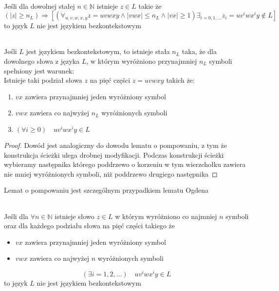 	\begin{lemat}~\\
		Jeśli dla dowolnej stałej $n\in\mathbb{N}$ istnieje $z\in L$ takie że
		\begin{equation}
			(|z| \geqslant n_L) \Rightarrow [( \forall_{u,v,w,x,y} z = uvwxy \wedge |vwx| \leqslant n_L \wedge |vx| \geqslant 1) \exists_{i=0,1,\dots} z_i = uv^iwx^iy \not\in L]
		\end{equation}
		to język $L$ nie jest językiem bezkontekstowym
	\end{lemat}			
		
	\begin{lemat}~\\
		Jeśli $L$ jest językiem bezkontekstowym, to istnieje stała $n_L$ taka, że dla dowolnego słowa z języka $L$, w którym wyróżniono przynajmniej
		$n_L$ symboli spełniony jest warunek:\\
		Istnieje taki podział słowa $z$ na pięć części $z = uvwxy$ takich że:
		\begin{enumerate}
			\item $vx$ zawiera przynajmniej jeden wyróżniony symbol
			\item $vwx$ zawiera co najwyżej $n_L$ wyróżnionych symboli
			\item $(\forall i\geqslant 0) \quad uv^iwx^iy \in L$
		\end{enumerate}
		
		\begin{proof}
			Dowód jest analogiczny do dowodu lematu o pompowaniu, z tym że konstrukcja ścieżki ulega drobnej modyfikacji.
			Podczas konstrukcji ścieżki wybieramy następnika którego poddrzewo o korzeniu w tym wierzchołku zawiera nie
			mniej wyróżnionych symboli, niż poddrzewo drugiego następnika
		\end{proof}			
		
		\begin{uwaga}
			Lemat o pompowaniu jest szczególnym przypadkiem lematu Ogdena
		\end{uwaga}
	\end{lemat}	
	
	\begin{lemat}~\\
		Jeśli dla $\forall n\in \mathbb{N}$ istnieje słowo $z \in L$ w którym wyróżniono co najmniej $n$ symboli oraz
		dla każdego podziału słowa na pięć części takiego że
		\begin{itemize}
			\item $vx$ zawiera przynajmniej jeden wyróżniony symbol
			\item $vwx$ zawiera co najwyżej $n$ wyróżnionych symboli
		\end{itemize}
		\begin{equation}
			(\exists i=1,2,\dots) \quad uv^iwx^iy \in L
		\end{equation}
		to język $L$ nie jest językiem bezkontekstowym
	\end{lemat}	

